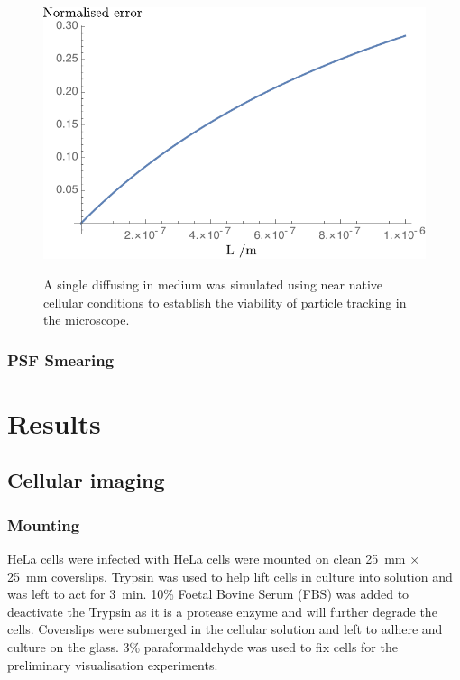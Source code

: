 \begin{figure}
  \centering
  \includegraphics{./mathematica/Error_vs_L}
  \caption{}
  \label{fig:Error_vs_L}
\end{figure}

\begin{figure}
  \centering
  \caption{A single diffusing in medium was simulated using near native cellular conditions to establish the viability of particle tracking in the microscope.}
  \label{}
\end{figure}

\subsubsection{PSF Smearing}


\section{Results}

\subsection{Cellular imaging}
\subsubsection{Mounting}
HeLa cells were infected with
HeLa cells were mounted on clean \SI{25}{\milli\metre} $\times$ \SI{25}{\milli\metre} coverslips.
Trypsin was used to help lift cells in culture into solution and was left to act for \SI{3}{\minute}.
10\% Foetal Bovine Serum (FBS) was added to deactivate the Trypsin as it is a protease enzyme and will further degrade the cells.
Coverslips were submerged in the cellular solution and left to adhere and culture on the glass.
3\% paraformaldehyde was used to fix cells for the preliminary visualisation experiments.

